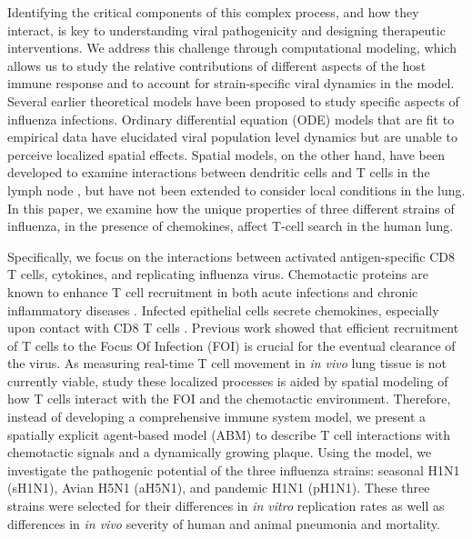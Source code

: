 \documentclass[preprint,10pt,authoryear]{elsarticle}
\begin{document}
Identifying the critical components of this complex process, and how they interact, is key to understanding viral pathogenicity and designing therapeutic interventions.  We address this challenge through computational modeling, which allows us to study the relative contributions of different aspects of the host immune response and to account for strain-specific viral dynamics in the model.  Several earlier theoretical models have been proposed to study specific aspects of influenza infections. Ordinary differential equation (ODE) models that are fit to empirical data \citep{Handel2008, Lee2009, Miao2010a, Saenz2010, Murillo2013, Crauste2015, Price2015} have elucidated viral population level dynamics but are unable to perceive localized spatial effects.  Spatial models, on the other hand, have been developed to examine interactions between dendritic cells and T cells in the lymph node \citep{Beauchemin2005, Beltman2007, Zheng2008, Mirsky2011, Celli2012, Vroomans2012, Textor2014}, but have not been extended to consider local conditions in the lung.   In this paper, we examine how the unique properties of three different strains of influenza, in the presence of chemokines, affect T-cell search in the human lung.

Specifically, we focus on the interactions between activated antigen-specific CD8 T cells, cytokines, and replicating influenza virus.  Chemotactic proteins are known to enhance T cell recruitment in both acute infections and chronic inflammatory diseases \citep{Gunn1998, Medoff2005, Okada2005, Castellino2006, Bromley2008}. Infected epithelial cells secrete chemokines, especially upon contact with CD8 T cells  \citep{Zhao2000, Chan2005}. Previous work showed that efficient recruitment of T cells to the Focus Of Infection (FOI) is crucial for the eventual clearance of the virus\citep{Cerwenka1999, Kim2011}.   As measuring real-time T cell movement in \textit{in vivo} lung tissue is not currently viable, study these localized processes is aided by spatial modeling of how T cells interact with the FOI and the chemotactic environment.  Therefore, instead of developing a comprehensive immune system model, we present a spatially explicit agent-based model (ABM) to describe T cell interactions with chemotactic signals and a dynamically growing plaque.  Using the model, we investigate the pathogenic potential of the three  influenza strains: seasonal H1N1 (sH1N1), Avian H5N1 (aH5N1), and pandemic H1N1 (pH1N1). These three strains were selected for their differences in \textit{in vitro} replication rates \citep{Mitchell2011} as well as differences in \textit{in vivo} severity of human and animal pneumonia and mortality.
\end{document}
